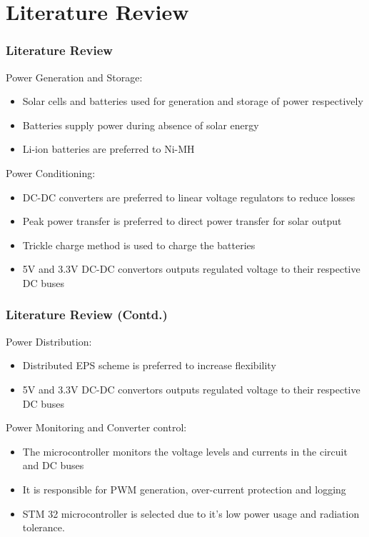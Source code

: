 \documentclass[aspectratio=169]{beamer}
\begin{document}
		\section{Literature Review}
		\begin{frame}
		\frametitle{Literature Review}

				
			Power Generation and Storage:
			\begin{itemize}
			\item  Solar cells and batteries used for generation and storage of power respectively
			\item Batteries supply power during absence of solar energy
			\item Li-ion batteries are preferred to Ni-MH \cite{p3}
		\end{itemize}
	
	
		Power Conditioning:
	\begin{itemize}
		\item DC-DC converters are preferred to linear voltage regulators to reduce losses
		\item Peak power transfer is preferred to direct power transfer for solar output \cite{p2}
		\item Trickle charge method is used to charge the batteries
		\item 5V and 3.3V DC-DC convertors outputs regulated voltage to their respective DC	 buses
	\end{itemize}
	\end{frame}
	\begin{frame}
		\frametitle{Literature Review (Contd.)}
		
				Power Distribution:
		\begin{itemize}
			\item Distributed EPS scheme \cite{p1} is preferred to increase flexibility
			\item 5V and 3.3V DC-DC convertors outputs regulated voltage to their respective DC	buses
			
		\end{itemize}
		
		
Power Monitoring and Converter control:
	\begin{itemize}
	\item The microcontroller monitors the voltage levels and currents in the circuit and DC buses
	\item It is responsible for PWM generation, over-current protection and logging
	\item STM 32 microcontroller is selected due to it's low power usage and radiation tolerance.

\end{itemize}


	\end{frame}
	
\end{document}
